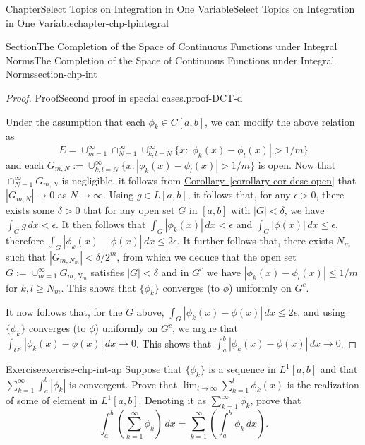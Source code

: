 \documentclass[oneside,10pt,]{book}
\newcommand{\xreffont}{\relax}
\numberwithin{equation}{section}
\begin{document}
\begin{chapterptx}{Chapter}{Select Topics on Integration in One Variable}{}{Select Topics on Integration in One Variable}{}{}{chapter-chp-lpintegral}
\begin{sectionptx}{Section}{The Completion of the Space of Continuous Functions under Integral Norms}{}{The Completion of the Space of Continuous Functions under Integral Norms}{}{}{section-chp-int}
\begin{proof}{Proof}{Second proof in special cases.}{proof-DCT-d}
\par
Under the assumption that each \(\phi_{k}\in C[a, b]\), we can modify the above relation as%
\begin{equation*}
E= \cup_{m=1}^{\infty}\cap_{N=1}^{\infty}\cup_{k, l=N}^{\infty}\{x: |\phi_{k}(x)-\phi_{l}(x)| > 1/m\}
\end{equation*}
and each \(G_{m, N} := \cup_{k, l=N}^{\infty}\{x: |\phi_{k}(x)-\phi_{l}(x)| > 1/m\}\) is open. Now that \(\cap_{N=1}^{\infty} G_{m, N}\) is negligible, it follows from \hyperref[corollary-cor-desc-open]{Corollary~{\xreffont\ref{corollary-cor-desc-open}}} that \(|G_{m, N}|\to 0\) as \(N\to \infty\). Using \(g\in L[a, b]\), it follows that,  for any \(\epsilon > 0\), there exists some \(\delta >0 \) that for any open set \(G\) in \([a, b]\) with \(|G| < \delta\), we have \(\int_{G}g\, dx < \epsilon\). It then follows that \(\int_{G}|\phi_{k}(x)|\, dx < \epsilon\) and \(\int_{G}|\phi(x)|\, dx \le \epsilon\), therefore \(\int_{G}|\phi_{k}(x)-\phi(x)|\, dx \le 2\epsilon\). It further follows that, there exists \(N_{m}\) such that \(|G_{m, N_{m}}| < \delta/2^{m}\), from which we deduce that the open set \(G :=\cup_{m=1}^{\infty} G_{m, N_{m}}\) satisfies \(|G| < \delta\) and in \(G^{c}\) we have \(|\phi_{k}(x)-\phi_{l}(x)| \le 1/m\) for \(k, l \ge N_{m}\).  This shows that \(\{\phi_{k}\}\) converges (to \(\phi\)) uniformly on \(G^{c}\).%
\par
It now follows that, for the \(G\) above,  \(\int_{G}|\phi_{k}(x)-\phi(x)|\, dx \le 2\epsilon\), and using \(\{\phi_{k}\}\) converges (to \(\phi\)) uniformly on \(G^{c}\), we argue that \(\int_{G^{c}}|\phi_{k}(x)-\phi(x)|\, dx\to 0\). This shows that \(\int_{a}^{b}|\phi_{k}(x)-\phi(x)|\, dx\to 0\).%
\end{proof}
\begin{inlineexercise}{Exercise}{}{exercise-chp-int-ap}%
Suppose that \(\{\phi_{k}\}\) is a sequence in \(L^{1}[a, b]\) and that \(\sum_{k=1 }^{\infty}\int_{a}^{b} |\phi_{k}|\) is convergent. Prove that  \(\lim_{l\to\infty} \sum_{k=1 }^{l} \phi_{k}(x)\) is the realization of some of element in \(L^{1}[a, b]\). Denoting it as \(\sum_{k=1 }^{\infty}\phi_{k}\), prove that%
\begin{equation*}
\int_{a}^{b} \left( \sum_{k=1 }^{\infty} \phi_{k}\right)\, dx =
\sum_{k=1 }^{\infty} \left(  \int_{a}^{b} \phi_{k}\, dx\right)\text{.}
\end{equation*}
%
\end{inlineexercise}%
\end{sectionptx}
%
%
\typeout{************************************************}

\end{chapterptx}
\end{document}
